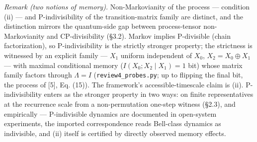 \documentclass[
]{article}
\begin{document}
\emph{Remark (two notions of memory).} Non-Markovianity of the process
--- condition (ii) --- and P-indivisibility of the transition-matrix
family are distinct, and the distinction mirrors the quantum-side gap
between process-tensor non-Markovianity and CP-divisibility (§3.2).
Markov implies P-divisible (chain factorization), so P-indivisibility is
the strictly stronger property; the strictness is witnessed by an
explicit family --- \(X_1\) uniform independent of \(X_0\),
\(X_2 = X_0 \oplus X_1\) --- with maximal conditional memory
(\(I(X_0; X_2 \mid X_1) = 1\) bit) whose matrix family factors through
\(\Lambda = I\) (\texttt{review4\_probes.py}; up to flipping the final
bit, the process of {[}5{]}, Eq. (15)). The framework's
accessible-timescale claim is (ii). P-indivisibility enters as the
stronger property in two ways: on finite representatives at the
recurrence scale from a non-permutation one-step witness (§2.3), and
empirically --- P-indivisible dynamics are documented in open-system
experiments, the imported correspondence reads Bell-class dynamics as
indivisible, and (ii) itself is certified by directly observed memory
effects.
\end{document}
